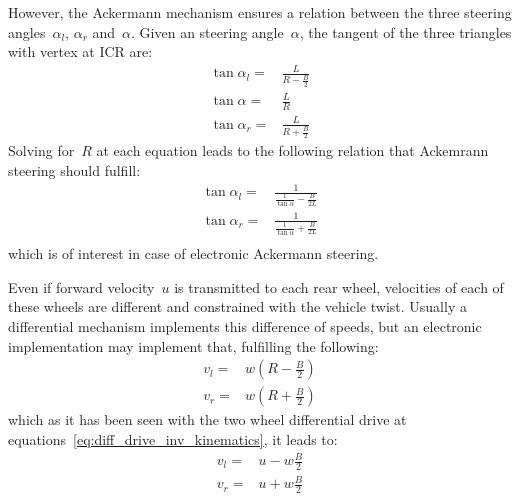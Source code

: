 However, the Ackermann mechanism ensures a relation between the three steering angles~$\alpha_l$, $\alpha_r$ and~$\alpha$. Given an steering angle~$\alpha$, the tangent of the three triangles with vertex at ICR are: 
\begin{align}
\tan \alpha_l = & \frac{L}{R-\frac{B}{2}} \\
\tan \alpha = & \frac{L}{R} \\
\tan \alpha_r = & \frac{L}{R+\frac{B}{2}} 
\end{align} 
Solving for~$R$ at each equation leads to the following relation that Ackemrann steering should fulfill: 
\begin{align}
\tan \alpha_l = & \frac{1}{\frac{1}{\tan \alpha} - \frac{B}{2L}} \\
\tan \alpha_r = & \frac{1}{\frac{1}{\tan \alpha} + \frac{B}{2L}} \\\end{align} 
which is of interest in case of electronic Ackermann steering. 

Even if forward velocity~$u$ is transmitted to each rear wheel,  velocities of each of these wheels are different and constrained with the vehicle twist. Usually a differential mechanism implements this difference of speeds, but an electronic implementation may implement that, fulfilling the following: 
\begin{align}
v_l = & w(R-\frac{B}{2}) \\
v_r = & w(R+\frac{B}{2})
\end{align} 
which as it has been seen with the two wheel differential drive at equations~\ref{eq:diff_drive_inv_kinematics}, it leads to: 
\begin{align}
v_l = & u -w\frac{B}{2} \\
v_r = & u + w\frac{B}{2}
\end{align} 



